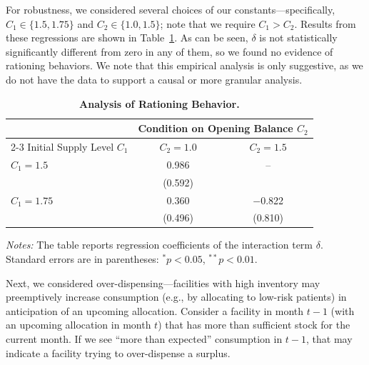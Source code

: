 \documentclass[12pt]{article}
\begin{document}
For robustness, we considered several choices of our constants---specifically, $C_1\in\{1.5,1.75\}$ and $C_2\in\{1.0,1.5\}$; note that we require $C_1 > C_2$. Results from these regressions are shown in Table~\ref{tab:rationing_interaction}. As can be seen, $\delta$ is not statistically significantly different from zero in any of them, so we found no evidence of rationing behaviors. We note that this empirical analysis is only suggestive, as we do not have the data to support a causal or more granular analysis.

\begin{table}[t]
\caption{\textbf{Analysis of Rationing Behavior.}}
\label{tab:rationing_interaction}
\centering
\begin{threeparttable}
\begin{tabular}{lcc}
\toprule
& \multicolumn{2}{c}{Condition on Opening Balance $C_2$} \\
\cmidrule(lr){2-3}
Initial Supply Level $C_1$ & $C_2=1.0$ & $C_2=1.5$ \\
\midrule
$C_1=1.5$ & 0.986 & -- \\
& (0.592) & \\
\addlinespace
$C_1=1.75$ & 0.360 & $-$0.822 \\
& (0.496) & (0.810) \\
\bottomrule
\end{tabular}
\begin{tablenotes}
[flushleft]
\footnotesize
\item \textit{Notes:} The table reports regression coefficients of the interaction term $\delta$. Standard errors are in parentheses: $^{*} p < 0.05$, $^{**} p < 0.01$.
\end{tablenotes}
\end{threeparttable}
\end{table}

Next, we considered over-dispensing---facilities with high inventory may preemptively increase consumption (e.g., by allocating to low-risk patients) in anticipation of an upcoming allocation. Consider a facility in month $t-1$ (with an upcoming allocation in month $t$) that has more than sufficient stock for the current month. If we see ``more than expected'' consumption in $t-1$, that may indicate a facility trying to over-dispense a surplus.
\end{document}

